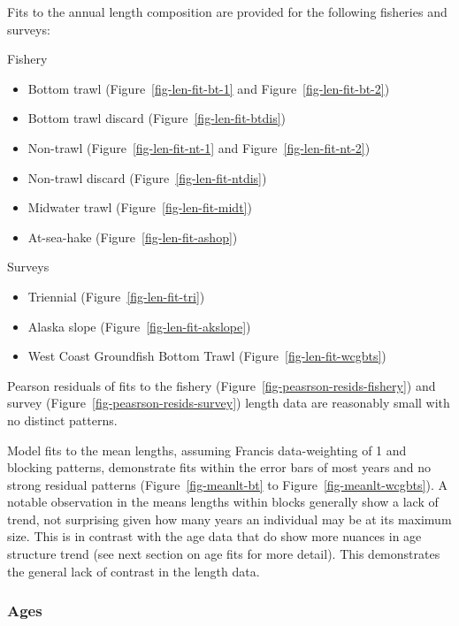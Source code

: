 \documentclass[
]{scrartcl}
\providecommand{\tightlist}{%
  \setlength{\itemsep}{0pt}\setlength{\parskip}{0pt}}\usepackage{longtable,booktabs,array}
\begin{document}
Fits to the annual length composition are provided for the following
fisheries and surveys:

Fishery

\begin{itemize}
\tightlist
\item
  Bottom trawl (Figure~\ref{fig-len-fit-bt-1} and
  Figure~\ref{fig-len-fit-bt-2})
\item
  Bottom trawl discard (Figure~\ref{fig-len-fit-btdis})
\item
  Non-trawl (Figure~\ref{fig-len-fit-nt-1} and
  Figure~\ref{fig-len-fit-nt-2})
\item
  Non-trawl discard (Figure~\ref{fig-len-fit-ntdis})
\item
  Midwater trawl (Figure~\ref{fig-len-fit-midt})
\item
  At-sea-hake (Figure~\ref{fig-len-fit-ashop})
\end{itemize}

Surveys

\begin{itemize}
\tightlist
\item
  Triennial (Figure~\ref{fig-len-fit-tri})
\item
  Alaska slope (Figure~\ref{fig-len-fit-akslope})
\item
  West Coast Groundfish Bottom Trawl (Figure~\ref{fig-len-fit-wcgbts})
\end{itemize}

Pearson residuals of fits to the fishery
(Figure~\ref{fig-peasrson-resids-fishery}) and survey
(Figure~\ref{fig-peasrson-resids-survey}) length data are reasonably
small with no distinct patterns.

Model fits to the mean lengths, assuming Francis data-weighting of 1 and
blocking patterns, demonstrate fits within the error bars of most years
and no strong residual patterns (Figure~\ref{fig-meanlt-bt} to
Figure~\ref{fig-meanlt-wcgbts}). A notable observation in the means
lengths within blocks generally show a lack of trend, not surprising
given how many years an individual may be at its maximum size. This is
in contrast with the age data that do show more nuances in age structure
trend (see next section on age fits for more detail). This demonstrates
the general lack of contrast in the length data.

\subsubsection{Ages}\label{ages}
\end{document}
